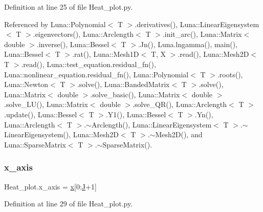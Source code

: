 Definition at line 25 of file Heat\+\_\+plot.\+py.



Referenced by Luna\+::\+Polynomial$<$ T $>$.\+derivatives(), Luna\+::\+Linear\+Eigensystem$<$ T $>$.\+eigenvectors(), Luna\+::\+Arclength$<$ T $>$.\+init\+\_\+arc(), Luna\+::\+Matrix$<$ double $>$.\+inverse(), Luna\+::\+Bessel$<$ T $>$.\+Jn(), Luna.\+lngamma(), main(), Luna\+::\+Bessel$<$ T $>$.\+rat(), Luna\+::\+Mesh1\+D$<$ T, X $>$.\+read(), Luna\+::\+Mesh2\+D$<$ T $>$.\+read(), Luna\+::test\+\_\+equation.\+residual\+\_\+fn(), Luna\+::nonlinear\+\_\+equation.\+residual\+\_\+fn(), Luna\+::\+Polynomial$<$ T $>$.\+roots(), Luna\+::\+Newton$<$ T $>$.\+solve(), Luna\+::\+Banded\+Matrix$<$ T $>$.\+solve(), Luna\+::\+Matrix$<$ double $>$.\+solve\+\_\+basic(), Luna\+::\+Matrix$<$ double $>$.\+solve\+\_\+\+L\+U(), Luna\+::\+Matrix$<$ double $>$.\+solve\+\_\+\+Q\+R(), Luna\+::\+Arclength$<$ T $>$.\+update(), Luna\+::\+Bessel$<$ T $>$.\+Y1(), Luna\+::\+Bessel$<$ T $>$.\+Yn(), Luna\+::\+Arclength$<$ T $>$.$\sim$\+Arclength(), Luna\+::\+Linear\+Eigensystem$<$ T $>$.$\sim$\+Linear\+Eigensystem(), Luna\+::\+Mesh2\+D$<$ T $>$.$\sim$\+Mesh2\+D(), and Luna\+::\+Sparse\+Matrix$<$ T $>$.$\sim$\+Sparse\+Matrix().

\mbox{\label{namespaceHeat__plot_a08bd2784d6b3bce18bb7f5edc54df897}} 
\subsubsection{\texorpdfstring{x\+\_\+axis}{x\_axis}}
{\footnotesize\ttfamily Heat\+\_\+plot.\+x\+\_\+axis = \hyperlink{namespaceHeat__plot_aa88370c16b85b784ccbde3ed88bc1991}{x}\mbox{[}0\+:\hyperlink{namespaceHeat__plot_a3cafcec38d886f33b35756791964bb58}{J}+1\mbox{]}}



Definition at line 29 of file Heat\+\_\+plot.\+py.

